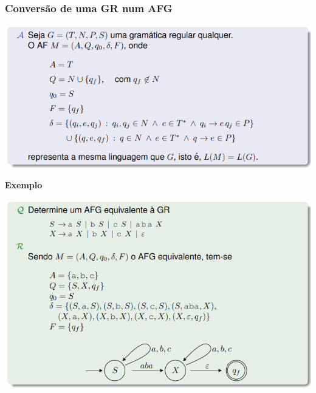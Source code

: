 \documentclass{article}
\begin{document}
\pagebreak

\subsubsection{Conversão de uma GR num AFG}

\begin{center}
  \includegraphics[scale=0.4]{88}
\end{center}

\textbf{Exemplo}

\begin{center}
  \includegraphics[scale=0.4]{89}
\end{center}
\end{document}
